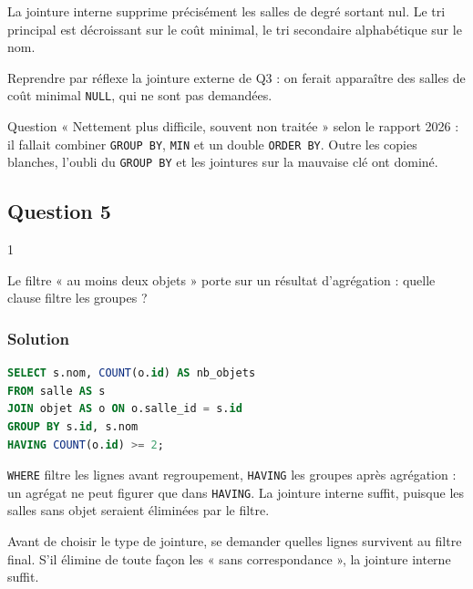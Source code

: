 \documentclass[11pt,a4paper]{article}
\begin{document}
La jointure interne supprime précisément les salles de degré sortant nul. Le tri principal est décroissant sur le coût minimal, le tri secondaire alphabétique sur le nom.

\begin{piege}

Reprendre par réflexe la jointure externe de Q3 : on ferait apparaître des salles de coût minimal \texttt{NULL}, qui ne sont pas demandées.

\end{piege}

\begin{jury}

Question « Nettement plus difficile, souvent non traitée » selon le rapport 2026 : il fallait combiner \texttt{GROUP\ BY}, \texttt{MIN} et un double \texttt{ORDER\ BY}. Outre les copies blanches, l'oubli du \texttt{GROUP\ BY} et les jointures sur la mauvaise clé ont dominé.

\end{jury}

\hypertarget{question-5}{%
\subsection{Question 5}\label{question-5}}

\begin{indication}{1}

Le filtre « au moins deux objets » porte sur un résultat d'agrégation : quelle clause filtre les groupes ?

\end{indication}

\hypertarget{solution-4}{%
\subsubsection{Solution}\label{solution-4}}

\begin{lstlisting}[language=SQL]
SELECT s.nom, COUNT(o.id) AS nb_objets
FROM salle AS s
JOIN objet AS o ON o.salle_id = s.id
GROUP BY s.id, s.nom
HAVING COUNT(o.id) >= 2;
\end{lstlisting}

\texttt{WHERE} filtre les lignes avant regroupement, \texttt{HAVING} les groupes après agrégation : un agrégat ne peut figurer que dans \texttt{HAVING}. La jointure interne suffit, puisque les salles sans objet seraient éliminées par le filtre.

\begin{methode}

Avant de choisir le type de jointure, se demander quelles lignes survivent au filtre final. S'il élimine de toute façon les « sans correspondance », la jointure interne suffit.

\end{methode}
\end{document}
